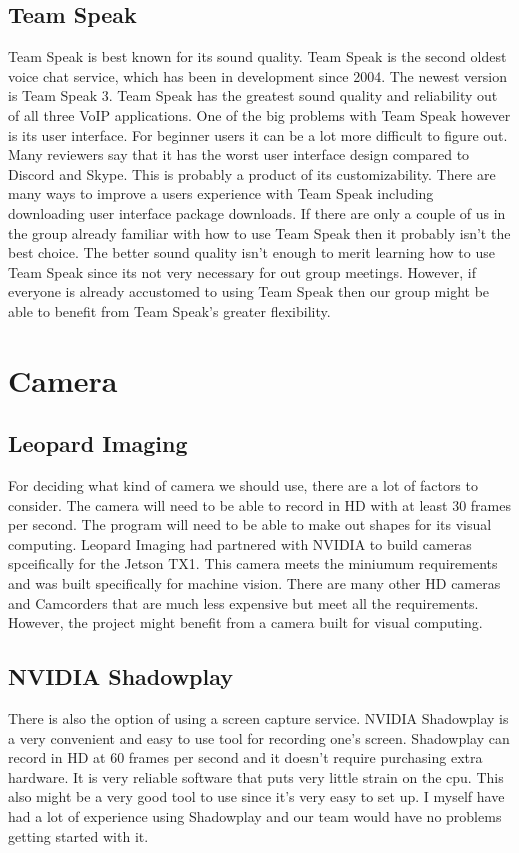 \documentclass{scrreprt}
\begin{document}
\subsection{Team Speak}
Team Speak is best known for its sound quality.
Team Speak is the second oldest voice chat service, which has been in development since 2004.
The newest version is Team Speak 3.
Team Speak has the greatest sound quality and reliability out of all three VoIP applications.
One of the big problems with Team Speak however is its user interface.
For beginner users it can be a lot more difficult to figure out.
Many reviewers say that it has the worst user interface design compared to Discord and Skype.
This is probably a product of its customizability.
There are many ways to improve a users experience with Team Speak including downloading user interface package downloads.
If there are only a couple of us in the group already familiar with how to use Team Speak then it probably isn't the best choice.
The better sound quality isn't enough to merit learning how to use Team Speak since its not very necessary for out group meetings.
However, if everyone is already accustomed to using Team Speak then our group might be able to benefit from Team Speak's greater flexibility.

\section{Camera}
\subsection{Leopard Imaging}
For deciding what kind of camera we should use, there are a lot of factors to consider.
The camera will need to be able to record in HD with at least 30 frames per second.
The program will need to be able to make out shapes for its visual computing.
Leopard Imaging had partnered with NVIDIA to build cameras spceifically for the Jetson TX1.
This camera meets the miniumum requirements and was built specifically for machine vision.
There are many other HD cameras and Camcorders that are much less expensive but meet all the requirements.
However, the project might benefit from a camera built for visual computing.

\subsection{NVIDIA Shadowplay}
There is also the option of using a screen capture service.
NVIDIA Shadowplay is a very convenient and easy to use tool for recording one's screen.
Shadowplay can record in HD at 60 frames per second and it doesn't require purchasing extra hardware.
It is very reliable software that puts very little strain on the cpu.
This also might be a very good tool to use since it's very easy to set up.
I myself have had a lot of experience using Shadowplay and our team would have no problems getting started with it.
\end{document}
